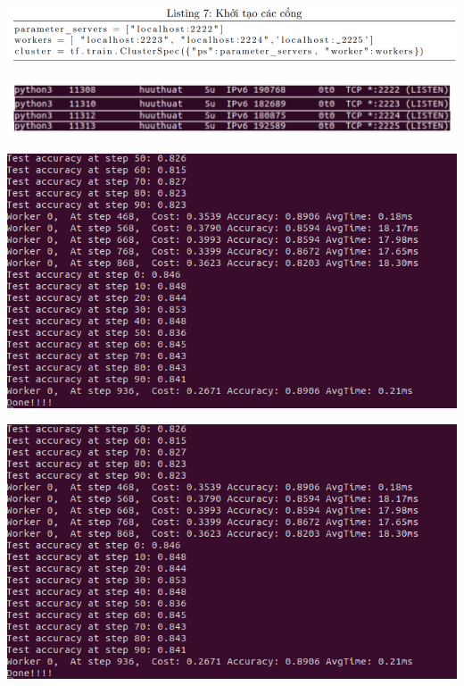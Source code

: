 \documentclass[notheorems,hyperref={bookmarks=true}]{beamer}
\theoremstyle{plain}
\numberwithin{equation}{section}
\begin{document}
\begin{footnotesize}
\begin{frame}
\begin{center}
\includegraphics[scale=0.52]{CODE2.PNG}
\end{center}
\end{frame}

\begin{frame}
\begin{center}
\includegraphics[scale=0.45]{IP.PNG}
\end{center}
\end{frame}


\begin{frame}
\begin{center}
\includegraphics[scale=0.45]{Dis_1.PNG}
\end{center}
\end{frame}


\begin{frame}
\begin{center}
\includegraphics[scale=0.45]{Dis_1.PNG}
\end{center}
\end{frame}


\end{footnotesize}
\end{document}
